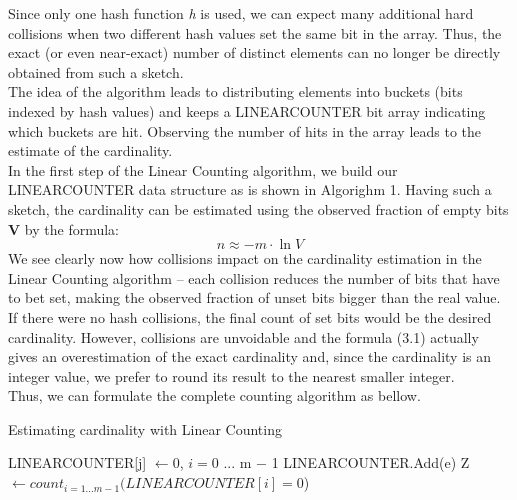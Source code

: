 \documentclass[a4paper,13pt]{article}
\theoremstyle{mytheor}
\begin{document}
\indent Since only one hash function \textit{h} is used, we can expect many additional
hard collisions when two different hash values set the same bit in the array.
Thus, the exact (or even near-exact) number of distinct elements can no
longer be directly obtained from such a sketch.\\
\indent The idea of the algorithm leads to distributing elements into buckets
(bits indexed by hash values) and keeps a LINEARCOUNTER bit array 
indicating which buckets are hit. Observing the number of hits in the array
leads to the estimate of the cardinality.\\
\indent In the first step of the Linear Counting algorithm, we build our
LINEARCOUNTER data structure as is shown in Algorighm 1. Having
such a sketch, the cardinality can be estimated using the observed
fraction of empty bits \textbf{V} by the formula:\\
\begin{equation}
    n \approx -m\cdot\ln V \tag{$3.1$}
\end{equation}
\indent We see clearly now how collisions impact on the cardinality estimation
in the Linear Counting algorithm -- each collision reduces the number
of bits that have to bet set, making the observed fraction of unset bits
bigger than the real value. If there were no hash collisions, the final
count of set bits would be the desired cardinality. However, collisions
are unvoidable and the formula (3.1) actually gives an overestimation
of the exact cardinality and, since the cardinality is an integer value, we
prefer to round its result to the nearest smaller integer.\\
\indent Thus, we can formulate the complete counting algorithm as bellow.\\
\vspace{0.5cm}
\begin{algorithm}[H]
    \DontPrintSemicolon
    \LinesNumberedHidden
    \caption[]{Estimating cardinality with Linear Counting}
    LINEARCOUNTER[j] $\gets 0$, $i = 0$ ... m $- $ 1\;
     { LINEARCOUNTER.Add(e) }
    Z $\gets count_{i=1...m-1} (LINEARCOUNTER[i] = 0 $)\;
\end{algorithm}
\end{document}
